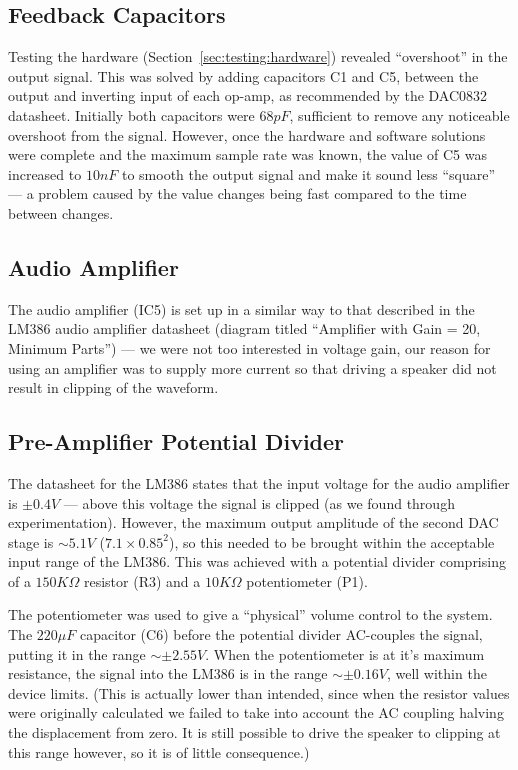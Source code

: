 \subsection{Feedback Capacitors}
\label{sec:design:hardware:feedback}

Testing the hardware (Section~\ref{sec:testing:hardware}) revealed ``overshoot'' in the output 
signal.  This was solved by adding capacitors C1 and C5, between the output and inverting input of 
each op-amp, as recommended by the DAC0832 datasheet\cite{dac0832}.  Initially both capacitors were 
$68pF$, sufficient to remove any noticeable overshoot from the signal.  However, once the hardware 
and software solutions were complete and the maximum sample rate was known, the value of C5 was 
increased to $10nF$ to smooth the output signal and make it sound less ``square'' --- a problem 
caused by the value changes being fast compared to the time between changes.

\subsection{Audio Amplifier}

The audio amplifier (IC5) is set up in a similar way to that described in the LM386 audio amplifier 
datasheet\cite{lm386} (diagram titled ``Amplifier with Gain = 20, Minimum Parts'') --- we were not 
too interested in voltage gain, our reason for using an amplifier was to supply more current so that 
driving a speaker did not result in clipping of the waveform.

\subsection{Pre-Amplifier Potential Divider}

The datasheet for the LM386\cite{lm386} states that the input voltage for the audio amplifier is 
$\pm0.4V$ --- above this voltage the signal is clipped (as we found through experimentation).  
However, the maximum output amplitude of the second DAC stage is $\sim5.1V$ ($7.1\times0.85^2$), so 
this needed to be brought within the acceptable input range of the LM386.  This was achieved with a 
potential divider comprising of a $150K\Omega$ resistor (R3) and a $10K\Omega$ potentiometer (P1).  

The potentiometer was used to give a ``physical'' volume control to the system.  The $220\mu{}F$ 
capacitor (C6) before the potential divider AC-couples the signal, putting it in the range 
$\sim\pm2.55V$.  When the potentiometer is at it's maximum resistance, the signal into the LM386 is 
in the range $\sim\pm0.16V$, well within the device limits.  (This is actually lower than intended, 
since when the resistor values were originally calculated we failed to take into account the AC 
coupling halving the displacement from zero.  It is still possible to drive the speaker to clipping 
at this range however, so it is of little consequence.)


